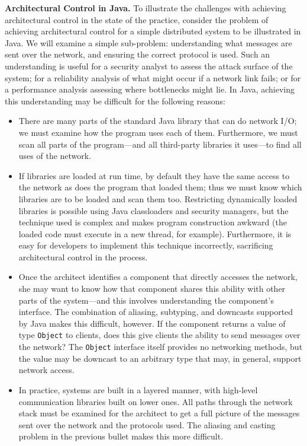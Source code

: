 \documentclass[runningheads]{llncs}
\newcommand{\minisec}[1]{\vspace{2ex}\noindent\textbf{#1}}
\begin{document}
\begin{sloppypar}
\minisec{Architectural Control in Java.}  To illustrate the challenges with achieving architectural control in the state of the practice, consider the problem of achieving architectural control for a simple distributed system to be illustrated in Java.  We will examine a simple sub-problem: understanding what messages are sent over the network, and ensuring the correct protocol is used.  Such an understanding is useful for a security analyst to assess the attack surface of the system; for a reliability analysis of what might occur if a network link fails; or for a performance analysis assessing where bottlenecks might lie.  In Java, achieving this understanding may be difficult for the following reasons:

\begin{itemize}

\item There are many parts of the standard Java library that can do network I/O; we must examine how the program uses each of them. Furthermore, we must scan all parts of the program---and all third-party libraries it uses---to find all uses of the network.

\item If libraries are loaded at run time, by default they have the same access to the network as does the program that loaded them; thus we must know which libraries are to be loaded and scan them too.  Restricting dynamically loaded libraries is possible using Java classloaders and security managers, but the technique used is complex and makes program construction awkward (the loaded code must execute in a new thread, for example).  Furthermore, it is easy for developers to implement this technique incorrectly, sacrificing architectural control in the process.

\item Once the architect identifies a component that directly accesses the network, she may want to know how that component shares this ability with other parts of the system---and this involves understanding the component's interface.  The combination of aliasing, subtyping, and downcasts supported by Java makes this difficult, however.  If the component returns a value of type \texttt{Object} to clients, does this give clients the ability to send messages over the network?  The \texttt{Object} interface itself provides no networking methods, but the value may be downcast to an arbitrary type that may, in general, support network access.

\item In practice, systems are built in a layered manner, with high-level communication libraries built on lower ones.  All paths through the network stack must be examined for the architect to get a full picture of the messages sent over the network and the protocols used.  The aliasing and casting problem in the previous bullet makes this more difficult.


\end{itemize}
\end{sloppypar}
\end{document}
